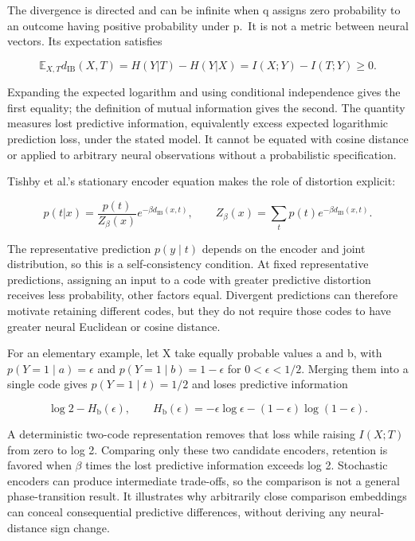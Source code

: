 \documentclass[11pt]{article}
\begin{document}
The divergence is directed and can be infinite when q assigns zero
probability to an outcome having positive probability under p.~It is not
a metric between neural vectors. Its expectation satisfies

\begin{equation}
\mathbb E_{X,T}d_{\mathrm{IB}}(X,T)
=H(Y|T)-H(Y|X)=I(X;Y)-I(T;Y)\geq0.
\end{equation}

Expanding the expected logarithm and using conditional independence
gives the first equality; the definition of mutual information gives the
second. The quantity measures lost predictive information, equivalently
excess expected logarithmic prediction loss, under the stated model. It
cannot be equated with cosine distance or applied to arbitrary neural
observations without a probabilistic specification.

Tishby et al.'s stationary encoder equation makes the role of distortion
explicit:

\begin{equation}
p(t|x)=\frac{p(t)}{Z_\beta(x)}e^{-\beta d_{\mathrm{IB}}(x,t)},\qquad
Z_\beta(x)=\sum_t p(t)e^{-\beta d_{\mathrm{IB}}(x,t)}.
\end{equation}

The representative prediction \(p(y\mid t)\) depends on the encoder and
joint distribution, so this is a self-consistency condition. At fixed
representative predictions, assigning an input to a code with greater
predictive distortion receives less probability, other factors equal.
Divergent predictions can therefore motivate retaining different codes,
but they do not require those codes to have greater neural Euclidean or
cosine distance.

For an elementary example, let X take equally probable values a and b,
with \(p(Y=1\mid a)=\epsilon\) and \(p(Y=1\mid b)=1-\epsilon\) for
\(0<\epsilon<1/2\). Merging them into a single code gives
\(p(Y=1\mid t)=1/2\) and loses predictive information

\begin{equation}
\log2-H_{\mathrm b}(\epsilon),\qquad
H_{\mathrm b}(\epsilon)=-\epsilon\log\epsilon
-(1-\epsilon)\log(1-\epsilon).
\end{equation}

A deterministic two-code representation removes that loss while raising
\(I(X;T)\) from zero to log 2. Comparing only these two candidate
encoders, retention is favored when \(\beta\) times the lost predictive
information exceeds log 2. Stochastic encoders can produce intermediate
trade-offs, so the comparison is not a general phase-transition result.
It illustrates why arbitrarily close comparison embeddings can conceal
consequential predictive differences, without deriving any
neural-distance sign change.
\end{document}
